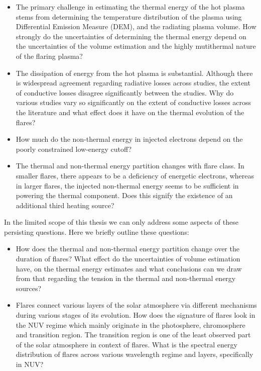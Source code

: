 \begin{itemize}
    \item The primary challenge in estimating the thermal energy of the hot plasma stems from determining the temperature distribution of the plasma using Differential Emission Measure (DEM), and the radiating plasma volume. How strongly do the uncertainties of determining the thermal energy depend on the uncertainties of the volume estimation and the highly mutithermal nature of the flaring plasma? 
    \item The dissipation of energy from the hot plasma is substantial. Although there is widespread agreement regarding radiative losses across studies, the extent of conductive losses disagree significantly between the studies. Why do various studies vary so significantly on the extent of conductive losses across the literature and what effect does it have on the thermal evolution of the flares?
    \item How much do the non-thermal energy in injected electrons depend on the poorly constrained low-energy cutoff?
    \item The thermal and non-thermal energy partition changes with flare class. In smaller flares, there appears to be a deficiency of energetic electrons, whereas in larger flares, the injected non-thermal energy seems to be sufficient in powering the thermal component. Does this signify the existence of an additional third heating source?
\end{itemize}

In the limited scope of this thesis we can only address some aspects of these persisting questions. Here we briefly outline these questions:
\begin{itemize}
\item How does the thermal and non-thermal energy partition change over the duration of flares? What effect do the uncertainties of volume estimation have, on the thermal energy estimates and what conclusions can we draw from that regarding the tension in the thermal and non-thermal energy sources?
\item Flares connect various layers of the solar atmosphere via different mechanisms during various stages of its evolution. How does the signature of flares look in the NUV regime which mainly originate in the photosphere, chromosphere and transition region. The transition region is one of the least observed part of the solar atmosphere in context of flares. What is the spectral energy distribution of flares across various wavelength regime and layers, specifically in NUV?
\end{itemize}

